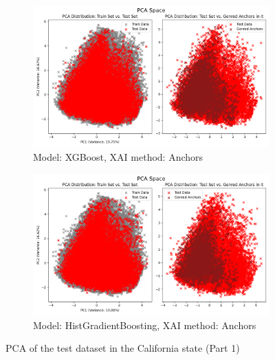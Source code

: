 \begin{figure}[h]
    \centering
    \begin{subfigure}[b]{0.9\textwidth}
        \includegraphics[width=\textwidth]{Images/pca/pca_xg_ca_anchors.png}
        \caption{Model: XGBoost, XAI method: Anchors}
        \label{fig:pca_xg_ca_anchors}
    \end{subfigure}
    \hfill
    \begin{subfigure}[b]{0.9\textwidth}
        \includegraphics[width=\textwidth]{Images/pca/pca_skrub_ca_anchors.png}
        \caption{Model: HistGradientBoosting, XAI method: Anchors}
        \label{fig:pca_skrub_ca_anchors}
    \end{subfigure}
    \caption{PCA of the test dataset in the California state (Part 1)}
 \end{figure}

